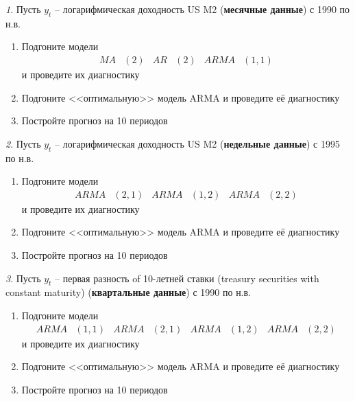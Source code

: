 \documentclass[12pt]{article}
\theoremstyle{remark}
\newtheorem{exercise}{}[subsection]
\begin{document}
\begin{exercise}
Пусть \(y_t\) -- логарифмическая доходность US M2 (\textbf{месячные данные}) с 1990 по н.в.
\begin{enumerate}
	\item Подгоните модели
	\begin{align*}
		MA&(2) & AR&(2) & ARMA&(1,1) 
	\end{align*} 
	и проведите их диагностику
	\item Подгоните <<оптимальную>> модель ARMA и проведите её диагностику
	\item Постройте прогноз на 10 периодов
\end{enumerate}
\end{exercise}

\begin{exercise}
Пусть \(y_t\) -- логарифмическая доходность US M2 (\textbf{недельные данные}) с 1995 по н.в.
\begin{enumerate}
	\item Подгоните модели
	\begin{align*}
		ARMA&(2,1) & ARMA&(1,2) & ARMA&(2,2)
	\end{align*} 
	и проведите их диагностику
	\item Подгоните <<оптимальную>> модель ARMA и проведите её диагностику
	\item Постройте прогноз на 10 периодов
\end{enumerate}
\end{exercise}

\begin{exercise}
Пусть \(y_t\) -- первая разность of 10-летней ставки (treasury securities  with constant maturity) 
(\textbf{квартальные данные}) с 1990 по н.в.
\begin{enumerate}
	\item Подгоните модели
	\begin{align*}
		ARMA&(1,1) & ARMA&(2,1) & ARMA&(1,2) & ARMA&(2,2)
	\end{align*} 
	и проведите их диагностику
	\item Подгоните <<оптимальную>> модель ARMA и проведите её диагностику
	\item Постройте прогноз на 10 периодов
\end{enumerate}
\end{exercise}
\end{document}
